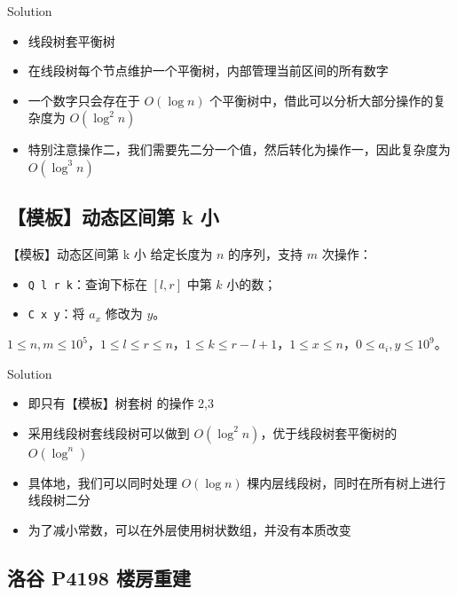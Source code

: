 ﻿\documentclass[aspectratio=169]{ctexbeamer}
\begin{document}
\begin{frame}{Solution}
    \begin{itemize}
        \item 线段树套平衡树
        \item 在线段树每个节点维护一个平衡树，内部管理当前区间的所有数字
        \item 一个数字只会存在于 $O(\log n)$ 个平衡树中，借此可以分析大部分操作的复杂度为 $O(\log^2 n)$
        \item 特别注意操作二，我们需要先二分一个值，然后转化为操作一，因此复杂度为 $O(\log^3 n)$
    \end{itemize}
\end{frame}

\subsection{【模板】动态区间第 k 小}

\begin{frame}{【模板】动态区间第 k 小}
    给定长度为 $n$ 的序列，支持 $m$ 次操作：
    \begin{itemize}
        \item \texttt{Q l r k}：查询下标在 $[l,r]$ 中第 $k$ 小的数；
        \item \texttt{C x y}：将 $a_x$ 修改为 $y$。
    \end{itemize}
    
    $1\le n,m\le 10^5$，$1\le l\le r\le n$，$1\le k\le r-l+1$，$1\le x\le n$，$0\le a_i,y\le 10^9$。
\end{frame}

\begin{frame}{Solution}
    \begin{itemize}
        \item 即只有【模板】树套树 的操作 2,3
        \item 采用线段树套线段树可以做到 $O(\log^2n)$，优于线段树套平衡树的 $O(\log^n)$
        \item 具体地，我们可以同时处理 $O(\log n)$ 棵内层线段树，同时在所有树上进行线段树二分
        \item 为了减小常数，可以在外层使用树状数组，并没有本质改变
    \end{itemize}
\end{frame}

\subsection{洛谷 P4198 楼房重建}
\end{document}
